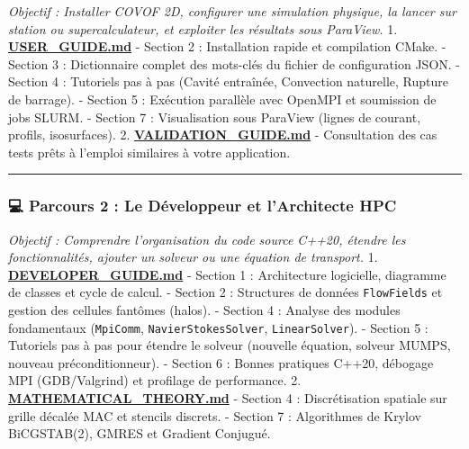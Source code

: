\documentclass[
  french,
]{article}
\begin{document}
\emph{Objectif : Installer COVOF 2D, configurer une simulation physique,
la lancer sur station ou supercalculateur, et exploiter les résultats
sous ParaView.} 1.
\textbf{\href{file:///Users/elhadjiibrahimathiam/Documents/PROJET_ANTIGRAVITY/COVOF_2D-FORTRAN/docs/USER_GUIDE.md}{USER\_GUIDE.md}}
- Section 2 : Installation rapide et compilation CMake. - Section 3 :
Dictionnaire complet des mots-clés du fichier de configuration JSON. -
Section 4 : Tutoriels pas à pas (Cavité entraînée, Convection naturelle,
Rupture de barrage). - Section 5 : Exécution parallèle avec OpenMPI et
soumission de jobs SLURM. - Section 7 : Visualisation sous ParaView
(lignes de courant, profils, isosurfaces). 2.
\textbf{\href{file:///Users/elhadjiibrahimathiam/Documents/PROJET_ANTIGRAVITY/COVOF_2D-FORTRAN/docs/VALIDATION_GUIDE.md}{VALIDATION\_GUIDE.md}}
- Consultation des cas tests prêts à l'emploi similaires à votre
application.

\begin{center}\rule{0.5\linewidth}{0.5pt}\end{center}

\subsubsection{💻 Parcours 2 : Le Développeur et l'Architecte
HPC}\label{parcours-2-le-duxe9veloppeur-et-larchitecte-hpc}

\emph{Objectif : Comprendre l'organisation du code source C++20, étendre
les fonctionnalités, ajouter un solveur ou une équation de transport.}
1.
\textbf{\href{file:///Users/elhadjiibrahimathiam/Documents/PROJET_ANTIGRAVITY/COVOF_2D-FORTRAN/docs/DEVELOPER_GUIDE.md}{DEVELOPER\_GUIDE.md}}
- Section 1 : Architecture logicielle, diagramme de classes et cycle de
calcul. - Section 2 : Structures de données \texttt{FlowFields} et
gestion des cellules fantômes (halos). - Section 4 : Analyse des modules
fondamentaux (\texttt{MpiComm}, \texttt{NavierStokesSolver},
\texttt{LinearSolver}). - Section 5 : Tutoriels pas à pas pour étendre
le solveur (nouvelle équation, solveur MUMPS, nouveau préconditionneur).
- Section 6 : Bonnes pratiques C++20, débogage MPI (GDB/Valgrind) et
profilage de performance. 2.
\textbf{\href{file:///Users/elhadjiibrahimathiam/Documents/PROJET_ANTIGRAVITY/COVOF_2D-FORTRAN/docs/MATHEMATICAL_THEORY.md}{MATHEMATICAL\_THEORY.md}}
- Section 4 : Discrétisation spatiale sur grille décalée MAC et stencils
discrets. - Section 7 : Algorithmes de Krylov BiCGSTAB(2), GMRES et
Gradient Conjugué.
\end{document}
